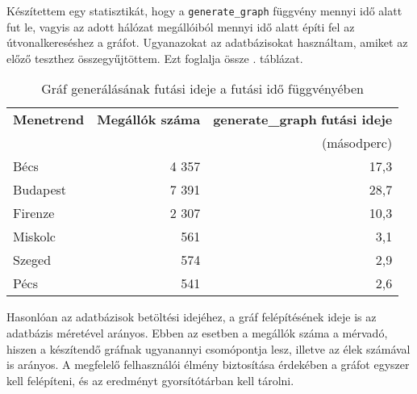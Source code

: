 Készítettem egy statisztikát, hogy a \texttt{generate\_graph} függvény mennyi idő alatt fut le, vagyis az adott hálózat megállóiból mennyi idő alatt építi fel az útvonalkereséshez a gráfot. Ugyanazokat az adatbázisokat használtam, amiket az előző teszthez összegyűjtöttem. Ezt foglalja össze . táblázat.

\begin{table}
\centering
\begin{tabular}{|l|r|r|}
\hline
\textbf{Menetrend} & \textbf{Megállók száma} & \textbf{generate\_graph} \textbf{futási ideje} \\
& & (másodperc) \\
\hline
Bécs & 4 357 & 17,3 \\
\hline
Budapest & 7 391 & 28,7 \\
\hline
Firenze & 2 307 & 10,3 \\
\hline
Miskolc & 561 & 3,1 \\
\hline
Szeged & 574 & 2,9 \\
\hline
Pécs & 541 & 2,6 \\
\hline
\end{tabular}
\caption{Gráf generálásának futási ideje a futási idő függvényében}
\label{tab:runtime}
\end{table}

\newpage

Hasonlóan az adatbázisok betöltési idejéhez, a gráf felépítésének ideje is az adatbázis méretével arányos. Ebben az esetben a megállók száma a mérvadó, hiszen a készítendő gráfnak ugyanannyi csomópontja lesz, illetve az élek számával is arányos. A megfelelő felhasználói élmény biztosítása érdekében a gráfot egyszer kell felépíteni, és az eredményt gyorsítótárban kell tárolni.
